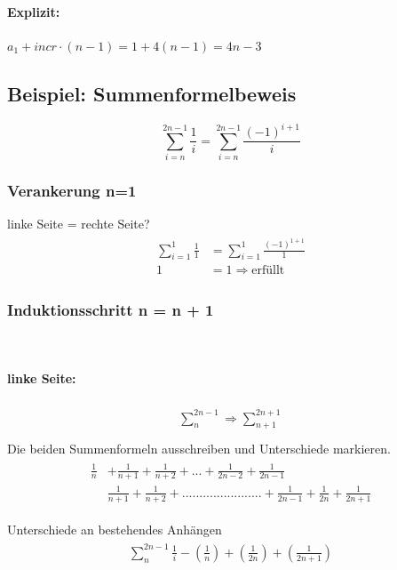 \paragraph{Explizit:} $a_1 + incr \cdot(n-1) = 1+ 4(n-1) = 4n - 3$

\subsection{Beispiel: Summenformelbeweis}
\[
	\sum_{i=n}^{2n-1} \frac{1}{i} = \sum_{i=n}^{2n-1} \frac{(-1)^{i+1}}{i}
\]

\subsubsection{Verankerung n=1}
linke Seite = rechte Seite?
\begin{align}
	\begin{split}
	\sum_{i=1}^{1} \frac{1}{1} &= \sum_{i=1}^{1} \frac{(-1)^{1+1}}{1} \\
	1 &= 1 \Rightarrow \text{erfüllt}
	\end{split}
\end{align}

\subsubsection{Induktionsschritt n = n + 1} \hfill \\
\paragraph{linke Seite:}
\begin{align}
	\begin{split}
	\sum_{n}^{2n-1} \Rightarrow \sum_{n+1}^{2n+1} \\
	\end{split}
\end{align}
Die beiden Summenformeln ausschreiben und Unterschiede markieren. 
\begin{align}
	\begin{split}
			\frac{1}{n} &+ \frac{1}{n+1} + \frac{1}{n+2} + ... + \frac{1}{2n-2} + \frac{1}{2n-1} \\
			&\frac{1}{n+1} + \frac{1}{n+2} + ....................... + \frac{1}{2n-1} + \frac{1}{2n} + \frac{1}{2n+1}
	\end{split}
\end{align}

Unterschiede an bestehendes Anhängen
\begin{align}
	\begin{split}
		\sum_{n}^{2n-1} \frac{1}{i} - (\frac{1}{n}) + (\frac{1}{2n}) + (\frac{1}{2n+1})
	\end{split}
\end{align}

